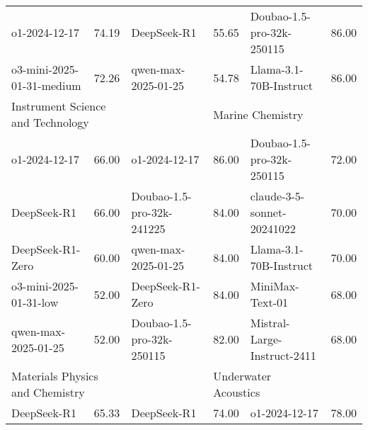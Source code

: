 {\begin{longtable}{p{4.2cm}>{\centering\arraybackslash} p{0.8cm}|p{4.2cm} >{\centering\arraybackslash} p{0.8cm}|p{4.2cm} >{\centering\arraybackslash} p{0.8cm}}
\cellcolor{blue!5} o1-2024-12-17 & \cellcolor{blue!2}74.19 & \cellcolor{yellow!5} DeepSeek-R1 & \cellcolor{yellow!2} 55.65 & \cellcolor{green!5} Doubao-1.5-pro-32k-250115 & \cellcolor{green!2} 86.00\\
\cellcolor{blue!5} o3-mini-2025-01-31-medium & \cellcolor{blue!2}72.26 & \cellcolor{yellow!5} qwen-max-2025-01-25 & \cellcolor{yellow!2} 54.78 & \cellcolor{green!5} Llama-3.1-70B-Instruct & \cellcolor{green!2} 86.00\\
\hline
\multicolumn{2}{p{5.15cm}|}{\cellcolor{blue!10} \centering Instrument Science and Technology} & \multicolumn{2}{p{5.15cm}|}{\cellcolor{yellow!10} \centering Radiation Medicine} & \multicolumn{2}{p{5.15cm}}{\cellcolor{green!10} \centering Marine Chemistry}\\
\hline
\cellcolor{blue!5} o1-2024-12-17 & \cellcolor{blue!2}66.00 & \cellcolor{yellow!5} o1-2024-12-17 & \cellcolor{yellow!2} 86.00 & \cellcolor{green!5} Doubao-1.5-pro-32k-250115 & \cellcolor{green!2} 72.00\\
\cellcolor{blue!5} DeepSeek-R1 & \cellcolor{blue!2}66.00 & \cellcolor{yellow!5} Doubao-1.5-pro-32k-241225 & \cellcolor{yellow!2} 84.00 & \cellcolor{green!5} claude-3-5-sonnet-20241022 & \cellcolor{green!2} 70.00\\
\cellcolor{blue!5} DeepSeek-R1-Zero & \cellcolor{blue!2}60.00 & \cellcolor{yellow!5} qwen-max-2025-01-25 & \cellcolor{yellow!2} 84.00 & \cellcolor{green!5} Llama-3.1-70B-Instruct & \cellcolor{green!2} 70.00\\
\cellcolor{blue!5} o3-mini-2025-01-31-low & \cellcolor{blue!2}52.00 & \cellcolor{yellow!5} DeepSeek-R1-Zero & \cellcolor{yellow!2} 84.00 & \cellcolor{green!5} MiniMax-Text-01 & \cellcolor{green!2} 68.00\\
\cellcolor{blue!5} qwen-max-2025-01-25 & \cellcolor{blue!2}52.00 & \cellcolor{yellow!5} Doubao-1.5-pro-32k-250115 & \cellcolor{yellow!2} 82.00 & \cellcolor{green!5} Mistral-Large-Instruct-2411 & \cellcolor{green!2} 68.00\\
\hline
\multicolumn{2}{p{5.15cm}|}{\cellcolor{blue!10} \centering Materials Physics and Chemistry} & \multicolumn{2}{p{5.15cm}|}{\cellcolor{yellow!10} \centering Anesthesiology} & \multicolumn{2}{p{5.15cm}}{\cellcolor{green!10} \centering Underwater Acoustics}\\
\hline
\cellcolor{blue!5} DeepSeek-R1 & \cellcolor{blue!2}65.33 & \cellcolor{yellow!5} DeepSeek-R1 & \cellcolor{yellow!2} 74.00 & \cellcolor{green!5} o1-2024-12-17 & \cellcolor{green!2} 78.00\\

\end{longtable}}
